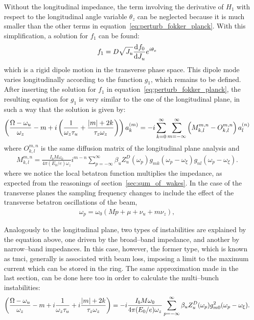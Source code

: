     Without the longitudinal impedance, the term involving the derivative of $H_1$ with respect to the longitudinal angle variable $\theta_z$ can be neglected because it is much smaller than the other terms in equation~\eqref{eq:perturb_fokker_planck}. With this simplification, a solution for $f_1$ can be found:
    \begin{align}
        f_1 = D \sqrt{J_u}\frac{\mathrm{d}^{{}}f_0}{\mathrm{d} J_u^{{}}}e^{i\theta_x}
    \end{align}
    which is a rigid dipole motion in the transverse phase space. This dipole mode varies longitudinally according to the function $g_1$, which remains to be defined. After inserting the solution for $f_1$ in equation~\eqref{eq:perturb_fokker_planck}, the resulting equation for $g_1$ is very similar to the one of the longitudinal plane, in such a way that the solution is given by:
    \begin{align}\label{eq:trans_mode_coupling_instability}
        \left(\frac{\Omega-\omega_u}{\omega_z}-m +
             i\left(\frac{1}{\omega_z\tau_u} +
                   \frac{|m|+2k}{\tau_z\omega_z}\right)\right)a_k^{(m)} =
        -i
        \sum_{k=0}^\infty\sum_{m=-\infty}^{\infty}\left(
                    M^{m,n}_{k,l}-O^{m,n}_{k,l}\right)a_l^{(n)}
    \end{align}
    where $O^{m,n}_{k,l}$ is the same diffusion matrix of the longitudinal plane analysis and
    \begin{align}\label{eq:trans_coupled_bunch_instability}
        M^{m,n}_{k,l} =
        \frac{I_bM\omega_0}{4\pi(E_0/e)\omega_z}
        i^{m-n}\sum_{p=-\infty}^{\infty}
            \beta_uZ_u^D(\omega_p) g_{mk}(\omega_p-\omega_\xi)g_{nl}(\omega_p-\omega_\xi).
    \end{align}
    where we notice the local betatron function multiplies the impedance, as expected from the reasonings of section~\ref{sec:sum_of_wakes}. In the case of the transverse planes the sampling frequency changes to include the effect of the transverse betatron oscillations of the beam,
    \begin{align}
        \omega_p = \omega_0(Mp + \mu + \nu_u + m\nu_z),
    \end{align}

    Analogously to the longitudinal plane, two types of instabilities are explained by the equation above, one driven by the broad--band impedance, and another by narrow--band impedances. In this case, however, the former type, which is known as \gls{tmci}, generally is associated with beam loss, imposing a limit to the maximum current which can be stored in the ring. The same approximation made in the last section, can be done here too in order to calculate the multi--bunch instabilities:
    \begin{align}
        \left(\frac{\Omega-\omega_u}{\omega_z}-m +
             i\frac{1}{\omega_z\tau_u} +
                   i\frac{|m|+2k}{\tau_z\omega_z}\right) =
        -i\frac{I_bM\omega_0}{4\pi(E_0/e)\omega_z}
        \sum_{p=-\infty}^{\infty}
            \beta_uZ_u^D(\omega_p) g_{m0}^2(\omega_p-\omega_\xi).
    \end{align}

